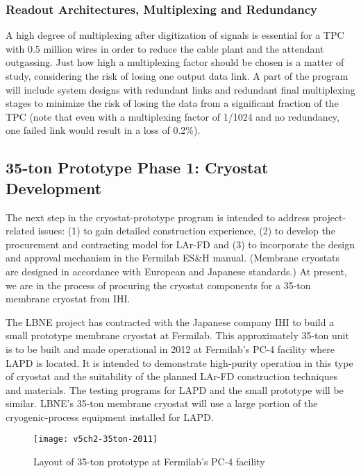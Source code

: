 \subsubsection{Readout Architectures, Multiplexing and Redundancy}
A high degree of multiplexing after digitization of signals is essential for a TPC with 0.5 million wires in order to reduce the cable plant and the attendant outgassing. Just how high a multiplexing factor should be chosen is a matter of study, considering the risk of losing one output data link. A part of the
program will include system designs with redundant links and redundant final multiplexing stages to minimize the risk of losing the data from a significant fraction of the TPC (note that even with a multiplexing factor of 1/1024 and no redundancy, one failed link would result in a loss of 0.2\%).


\subsection{35-ton Prototype Phase 1: Cryostat Development}
\label{35tonprototype}


The next step in the cryostat-prototype program is intended to address project-related issues: (1) to gain detailed construction experience, (2) to develop the procurement and contracting model for LAr-FD and (3) to incorporate the design and approval mechanism in the Fermilab ES\&H manual. (Membrane cryostats are designed in accordance with European and Japanese standards.) At present, we are in the process of procuring the cryostat components for a 35-ton membrane cryostat from IHI.

The LBNE project has contracted with the Japanese company IHI to build a small prototype membrane cryostat at Fermilab.  This approximately 35-ton unit is to be built and made operational in 2012 at Fermilab's PC-4 facility where LAPD is located.  It is intended to demonstrate high-purity operation in this type of cryostat and the suitability of the planned LAr-FD construction techniques and materials.  The testing programs for LAPD and the small prototype will be similar.  LBNE's 35-ton membrane cryostat will use a large portion of the cryogenic-process equipment installed for LAPD.

\begin{figure}[htbp]
\centering
\texttt{[image: v5ch2-35ton-2011]} 
\caption{Layout of 35-ton prototype at Fermilab's PC-4 facility}
\label{fig:v5ch2-35ton-2011}
\end{figure}

